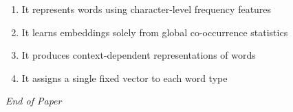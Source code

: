 \documentclass[12pt]{article}
\begin{document}
\begin{enumerate}[label=Q\arabic*.]
 \begin{enumerate}[label=(\Alph*)]
     \item It represents words using character-level frequency features
     \item It learns embeddings solely from global co-occurrence statistics
     \item It produces context-dependent representations of words
     \item It assigns a single fixed vector to each word type
 \end{enumerate}
 
 \end{enumerate}
 
 \vfill
 \noindent\textit{End of Paper}
 
 
\end{document}
